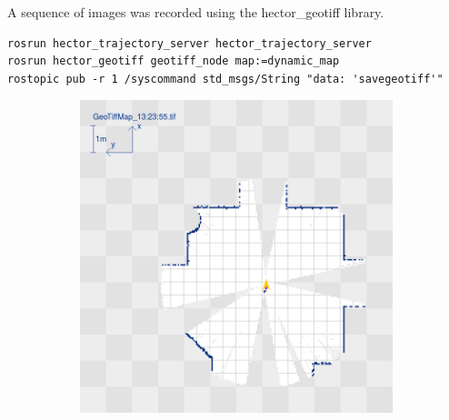 \documentclass[a4paper]{article}
\begin{document}
A sequence of images was recorded using the hector\_geotiff library.

\begin{lstlisting}[caption=Recording the map as generated by gmapping]
rosrun hector_trajectory_server hector_trajectory_server
rosrun hector_geotiff geotiff_node map:=dynamic_map
rostopic pub -r 1 /syscommand std_msgs/String "data: 'savegeotiff'"
\end{lstlisting}


\begin{figure}[h!]
  \centering
  \begin{subfigure}[b]{0.4\textwidth}
    \includegraphics[width=\textwidth,height=\textheight,keepaspectratio]{img/move_square/1.png}
  \end{subfigure}
  \begin{subfigure}[b]{0.4\textwidth}

\end{subfigure}
\end{figure}
\end{document}
